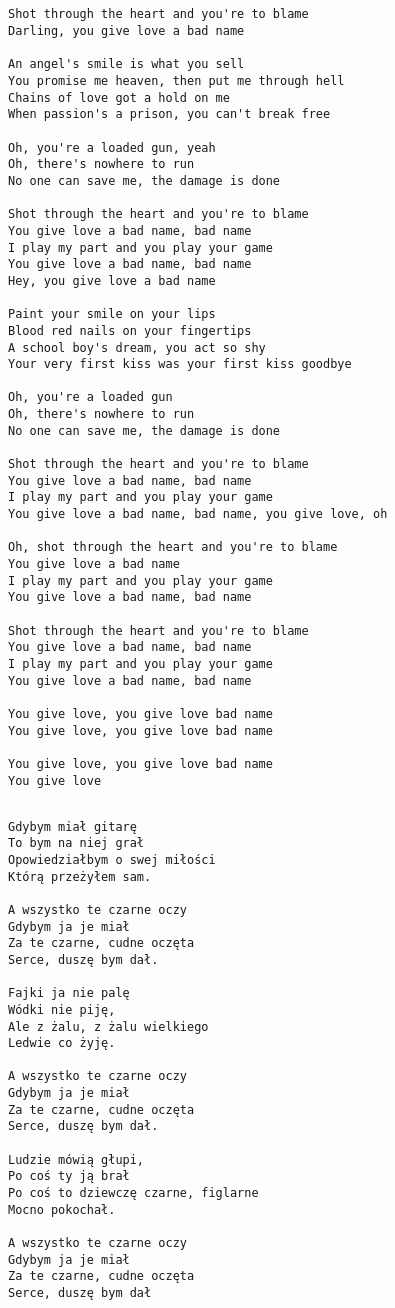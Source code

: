 \documentclass[12pt]{article}
\begin{document}
\subsection*{}
\begin{verbatim}
Shot through the heart and you're to blame
Darling, you give love a bad name

An angel's smile is what you sell
You promise me heaven, then put me through hell
Chains of love got a hold on me
When passion's a prison, you can't break free

Oh, you're a loaded gun, yeah
Oh, there's nowhere to run
No one can save me, the damage is done

Shot through the heart and you're to blame
You give love a bad name, bad name
I play my part and you play your game
You give love a bad name, bad name
Hey, you give love a bad name

Paint your smile on your lips
Blood red nails on your fingertips
A school boy's dream, you act so shy
Your very first kiss was your first kiss goodbye

Oh, you're a loaded gun
Oh, there's nowhere to run
No one can save me, the damage is done

Shot through the heart and you're to blame
You give love a bad name, bad name
I play my part and you play your game
You give love a bad name, bad name, you give love, oh

Oh, shot through the heart and you're to blame
You give love a bad name
I play my part and you play your game
You give love a bad name, bad name

Shot through the heart and you're to blame
You give love a bad name, bad name
I play my part and you play your game
You give love a bad name, bad name

You give love, you give love bad name
You give love, you give love bad name

You give love, you give love bad name
You give love
\end{verbatim}
\clearpage

\subsection*{}
\begin{verbatim}
Gdybym miał gitarę
To bym na niej grał
Opowiedziałbym o swej miłości
Którą przeżyłem sam.

A wszystko te czarne oczy
Gdybym ja je miał
Za te czarne, cudne oczęta
Serce, duszę bym dał.

Fajki ja nie palę
Wódki nie piję,
Ale z żalu, z żalu wielkiego
Ledwie co żyję.

A wszystko te czarne oczy
Gdybym ja je miał
Za te czarne, cudne oczęta
Serce, duszę bym dał.

Ludzie mówią głupi,
Po coś ty ją brał
Po coś to dziewczę czarne, figlarne
Mocno pokochał.

A wszystko te czarne oczy
Gdybym ja je miał
Za te czarne, cudne oczęta
Serce, duszę bym dał
\end{verbatim}
\clearpage
\end{document}

